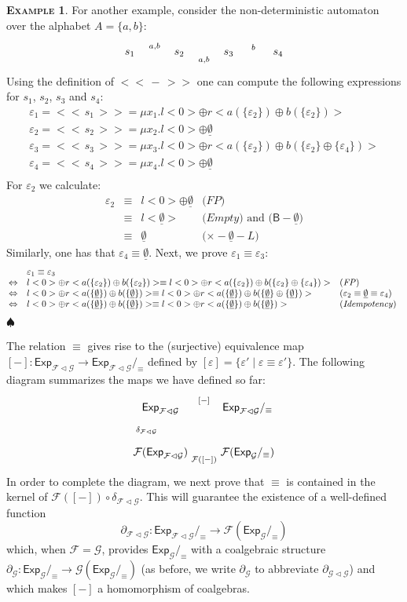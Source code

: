 \documentclass{LMCS}
\newcommand\E\varepsilon
\newcommand\Exp{\mathsf{Exp}}
\newcommand\B{\mathsf{B}}
\newcommand\G{\mathcal{G}}
\newcommand\F{\mathcal{F}}
\newcommand\emp{\underline\emptyset}
\def\expr#1{<\!< \, #1 \, >\!>}
\def\hyph{-\penalty0\hskip0pt\relax}
\theoremstyle{definition}
\theoremstyle{plain}
\theoremstyle{plain}
\theoremstyle{plain}
\theoremstyle{plain}
\theoremstyle{definition}
\theoremstyle{definition}
\newtheorem{myexample}[mydefinition]{\textsc{Example}}
\newenvironment{example}{
\begin{myexample}}
    {\hfill$\spadesuit$\end{myexample}}
\begin{document}
\begin{example}
For another example, consider the non\hyph deterministic automaton over the alphabet $A=\{a,b\}$:
\[
\xymatrix{*++[o][F]{s_1} \ar[r]^-{a,b}& *++[o][F]{s_2} &
*++[o][F]{s_3}\ar[l]^-{a,b} \ar[r]^-{b}& *++[o][F]{s_4} }
\] 
Using the definition of $\expr -$ one can compute 
the following expressions for $s_1$, $s_2$, $s_3$ and $s_4$:
\[
\begin{array}{l}
\E_1 =  \expr{s_1} =\mu x_1. l<0> \oplus r<a(\{\E_2\})\oplus
b(\{\E_2\})> \\
\E_2 =\expr{s_2} = \mu x_2. l<0> \oplus \emp\\
\E_3 = \expr{s_3} =\mu x_3. l<0> \oplus r< a(\{\E_2\}) \oplus
b(\{\E_2\}\oplus\{\E_4\})>\\
\E_4 = \expr{s_4} =\mu x_4. l<0> \oplus \emp\\
\end{array}
\]
For $\E_2$ we calculate:
\[
\begin{array}{lcll}
\E_2 &\equiv& l<0>\oplus \emp& \text{($\mathit{FP}$)}\\
&\equiv& l<\emp> &  \text{($\mathit{Empty}$) and ($\B -
\emp$)}\\
&\equiv& \emp &  \text{($\times -
\emp - L$)}
\end{array}
\]
Similarly, one has that $\E_4\equiv \emp$.
Next, we prove $\E_1\equiv\E_3$:
\[
\hspace{-.3cm}\begin{array}{@{}lcll}
&& \E_1\equiv \E_3 \\
&\Leftrightarrow &l<0> \oplus r<a(\{\E_2\})\oplus b(\{\E_2\})>\equiv  l<0> \oplus r< a(\{\E_2\}) \oplus
b(\{\E_2\}\oplus\{\E_4\})> & \text{($\mathit{FP}$)}\\
&\Leftrightarrow& l<0> \oplus r<a(\{\emp\})\oplus
b(\{\emp\})>\equiv  l<0> \oplus r< a(\{\emp\}) \oplus
b(\{\emp\}\oplus\{\emp\})> &\text{($\E_2\equiv
\emp\equiv \E_4$)}\\
&\Leftrightarrow& l<0> \oplus r<a(\{\emp\})\oplus
b(\{\emp\})>\equiv  l<0> \oplus r< a(\{\emp\}) \oplus
b(\{\emp\})> &\text{($\mathit{Idempotency}$)}\\
\end{array}
\]
\end{example}
The relation $\equiv$ gives rise to the (surjective) equivalence map
$[-]\colon \Exp_{\F\lhd \G} \to \Exp_{\F\lhd \G}/_{\equiv}$ defined by $[\E] =
\{\E'\mid \E\equiv\E'\}$. The following diagram summarizes the maps we
have defined so far:
\[
\xymatrix{
\Exp_{\F\lhd \G}\ar[d]_{\delta_{\F\lhd \G}} \ar[r]^{[-]} &
\Exp_{\F\lhd \G}/_{\equiv}\\
\F(\Exp_{\F\lhd \G})\ar[r]_{\F([-])} & \F (\Exp_\G/_{\equiv}) 
}
\]
In order to complete the diagram, we next prove that
$\equiv$ is contained in the kernel
of $\F ([-]) \circ \delta_{\F\lhd \G}$. This will
guarantee the existence of a well-defined function 
$$\partial_{\F\lhd
\G}\colon
\Exp_{\F\lhd \G}/_{\equiv} \to \F(\Exp_\G/_{\equiv})$$ which, when $\F=\G$,
provides $\Exp_\G/_{\equiv}$ with a coalgebraic structure $\partial_\G\colon
\Exp_\G/_{\equiv}\to \G(\Exp_\G/_{\equiv})$ (as before, we write $\partial_\G$ to abbreviate
$\partial_{\G\lhd \G}$) and which makes $[-]$ a homomorphism of
coalgebras.
 
\end{document}
